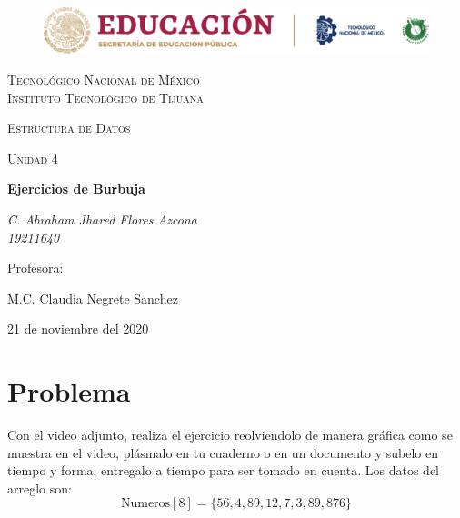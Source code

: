 \documentclass[letterpaper, 12pt]{article}
\begin{document}
    
    \begin{titlepage}
        \begin{figure}[ht]
            \centering
            \includegraphics[width=15cm]{logosITT.png}
        \end{figure}
        \centering
        {\scshape\LARGE Tecnológico Nacional de México\\Instituto Tecnológico de Tijuana\par}
        \vspace{1cm}
        {\scshape\Large Estructura de Datos\par}
        \vspace{1cm}
        {\scshape\Large Unidad 4\par}
        \vspace{1.5cm}
        {\huge\bfseries Ejercicios de Burbuja\par}
        \vspace{2cm}
        {\Large\itshape C. Abraham Jhared Flores Azcona\\19211640\par}
        \vfill
        Profesora: \par
        M.C. Claudia Negrete Sanchez
        
        \vfill

        {\large 21 de noviembre del 2020}
    \end{titlepage}

    \newpage
    \thispagestyle{fancy}
    \setcounter{page}{1}
    \section{Problema}
    Con el video adjunto, realiza el ejercicio reolviendolo de manera gráfica como se muestra en el video, plásmalo en tu cuaderno o en un documento y subelo en tiempo y forma,
    entregalo a tiempo para ser tomado en cuenta. Los datos del arreglo son:
    \[\text{Numeros}[8]=\{56, 4, 89, 12, 7, 3, 89, 876\}\]
\end{document}
